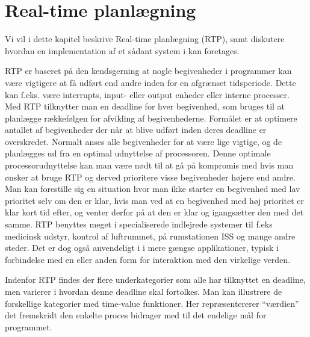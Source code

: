 \chapter{Real-time planlægning}
Vi vil i dette kapitel beskrive Real-time planlægning (RTP), samt diskutere hvordan en implementation af et sådant system i \pycsp kan foretages. 

RTP er baseret på den kendsgerning at nogle begivenheder i programmer kan være vigtigere at få udført end andre inden for en afgrænset tidsperiode. Dette kan f.eks. være interrupts, input- eller output enheder eller interne processer. Med RTP tilknytter man en deadline for hver begivenhed, som bruges til at planlægge rækkefølgen for afvikling af begivenhederne. Formålet er at optimere antallet af begivenheder der når at blive udført inden deres deadline er overskredet. Normalt anses alle begivenheder for at være lige vigtige, og de planlægges ud fra en optimal udnyttelse af processoren. Denne optimale processorudnyttelse kan man være nødt til at gå på kompromis med hvis man ønsker at bruge RTP og derved prioritere visse begivenheder højere end andre. Man kan forestille sig en situation hvor man ikke starter en begivenhed med lav prioritet selv om den er klar, hvis man ved at en begivenhed med høj prioritet er klar kort tid efter, og venter derfor på at den er klar og igangsætter den med det samme. 
RTP benyttes meget i specialiserede indlejrede systemer til f.eks medicinsk udstyr, kontrol af luftrummet, på rumstationen ISS\cite{Audsley1990} og mange andre steder. Det er dog også anvendeligt i i mere gængse applikationer, typisk i forbindelse med en eller anden form for interaktion med den virkelige verden. 

Indenfor RTP findes der flere underkategorier som alle har tilknyttet en deadline, men varierer i hvordan denne deadline skal fortolkes. Man kan illustrere de forskellige kategorier med time-value funktioner. Her repræsentererer ``værdien'' det fremskridt den enkelte proces bidrager med til det endelige mål for programmet.

